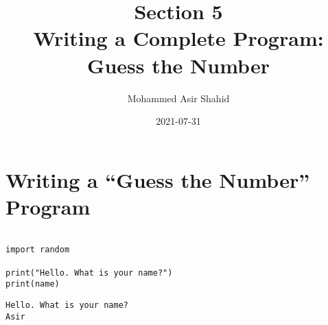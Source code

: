 \documentclass[11pt]{article}
\author{Mohammed Asir Shahid}
\date{2021-07-31}
\title{Section 5\\\medskip
\large Writing a Complete Program: Guess the Number}
\begin{document}
\maketitle
\tableofcontents


\section{Writing a ``Guess the Number'' Program}
\label{sec:org3140f30}


\begin{verbatim}

import random

print("Hello. What is your name?")
print(name)

\end{verbatim}

\begin{verbatim}
Hello. What is your name?
Asir
\end{verbatim}
\end{document}
